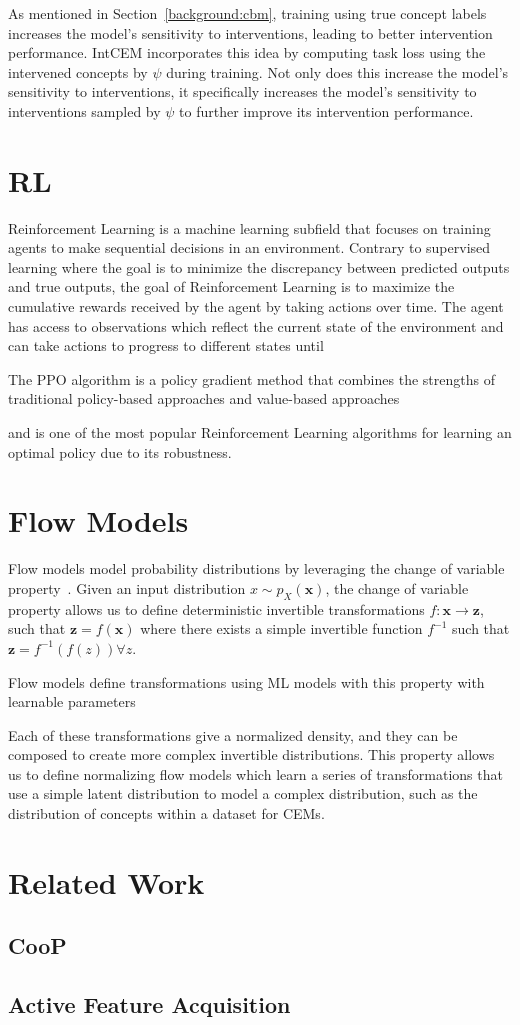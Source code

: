 As mentioned in Section~\ref{background:cbm}, training using
true concept labels increases the model's sensitivity
to interventions, leading to better intervention performance.
IntCEM incorporates this idea by computing task loss
using the intervened concepts by $\psi$ during training.
Not only does this increase the model's sensitivity to interventions,
it specifically increases the model's sensitivity to interventions
sampled by $\psi$ to further improve its intervention performance.

\section{RL}\label{background:rl} %
Reinforcement Learning is a machine learning subfield that 
focuses on training agents to make sequential decisions in an environment.
Contrary to supervised learning
where the goal is to minimize the discrepancy between predicted outputs and true outputs,
the goal of Reinforcement Learning is to maximize the cumulative rewards received by the agent
by taking actions over time. The agent has access to observations which reflect the current state
 of the environment and can take actions to progress to different states until 

 The PPO algorithm is a policy gradient method that 
combines the strengths of traditional policy-based approaches
and value-based approaches~\cite{deep-q-learning, deep-q-learning-2}

and 
is one of the most popular Reinforcement Learning algorithms for learning
an optimal policy due to its robustness.
 
\section{Flow Models}\label{background:flow}
Flow models model probability distributions by leveraging the change of variable property~\cite{normalizing-flows}.
Given an input distribution $x \sim p_X(\mathbf{x})$, the change of variable property allows us to define
deterministic invertible transformations $f: \mathbf{x} \to \mathbf{z}$, such that 
$\mathbf{z} = f(\mathbf{x})$ where there exists a simple invertible function
$f^{-1}$ such that $\mathbf{z} = f^{-1}(f(z)) \forall z$. 



Flow models define transformations
using ML models with this property with learnable parameters

Each of these transformations give a normalized
density, and they can be composed to create more complex invertible distributions.
This property allows us to define normalizing flow models which learn a series of transformations
that use a simple latent distribution to model a complex distribution, such as 
the distribution of concepts within a dataset for CEMs.

\section{Related Work}


\subsection{CooP}

\subsection{Active Feature Acquisition}


